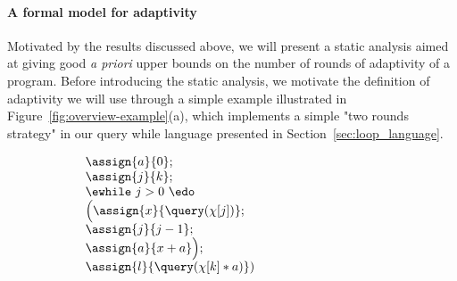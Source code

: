 \paragraph{{A formal model for adaptivity}}
Motivated by the results discussed above, we will present a static analysis aimed at giving good \emph{a priori} upper bounds on the number of rounds of adaptivity of a program. Before introducing the static analysis, we motivate the definition of adaptivity we will use through a simple example illustrated in Figure~\ref{fig:overview-example}(a), which implements a simple "two rounds strategy" in our query while language presented in Section~\ref{sec:loop_language}.

{\small
\begin{figure}
\centering
\begin{subfigure}{.25\textwidth}
\begin{centering}
$  \begin{array}{l}
           { \assign{a}{0}} ; \\
            {\assign{j}{k} }; \\
            \ewhile ~ {j > 0} ~ \edo ~ \\
            \Big(
             {\assign{x}{\query(\chi[j])} }  ; \\
             {\assign{j}{j-1}} ;\\
            {\assign{a}{x + a}}      \Big);\\
            {\assign{l}{\query(\chi[k]*a)})}\\
        \end{array}
$
\caption{}
\end{centering}
\end{subfigure}
\quad
\begin{subfigure}{.25\textwidth}
\end{subfigure}
\end{figure}}

